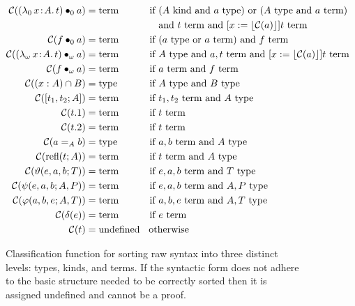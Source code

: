 \begin{figure}
\begin{align*}
        \mathcal{C}(\app{(\abs{\lambda_0}{x}{A}{t})}{0}{a}) &=\!\! \pterm &\text{if }& (A\pkind \text{ and } a\ptype) \text{ or } (A\ptype \text{ and } a\pterm) \\
            &&&\text{and } t\pterm \text{ and } [x := \ptrunc{\mathcal{C}(a)}]t\pterm \\
        \mathcal{C}(\app{f}{0}{a}) &=\!\! \pterm &\text{if }& (a\ptype \text{ or } a\pterm) \text{ and } f\pterm \\
        \mathcal{C}(\app{(\abs{\lambda_\omega}{x}{A}{t})}{\omega}{a}) &=\!\! \pterm &\text{if }& A\ptype \text{ and } a, t\pterm \text{ and } [x := \ptrunc{\mathcal{C}(a)}]t\pterm \\
        \mathcal{C}(\app{f}{\omega}{a}) &=\!\! \pterm &\text{if }& a\pterm \text{ and } f\pterm \\
        \mathcal{C}((x : A) \cap B) &=\!\! \ptype &\text{if }& A\ptype \text{ and } B\ptype \\
        \mathcal{C}([t_1, t_2; A]) &=\!\! \pterm &\text{if }& t_1, t_2\pterm \text{ and } A\ptype \\
        \mathcal{C}(t.1) &=\!\! \pterm &\text{if }& t\pterm \\
        \mathcal{C}(t.2) &=\!\! \pterm &\text{if }& t\pterm \\
        \mathcal{C}(a =_A b) &=\!\! \ptype &\text{if }& a, b\pterm \text{ and } A\ptype \\
        \mathcal{C}(\prefl(t; A)) &=\!\! \pterm &\text{if }& t\pterm \text{ and } A\ptype \\
        \mathcal{C}(\vartheta(e, a, b; T)) &=\!\! \pterm &\text{if }& e, a, b\pterm \text{ and } T\ptype \\
        \mathcal{C}(\psi(e, a, b; A, P)) &=\!\! \pterm &\text{if }& e, a, b\pterm \text{ and } A, P\ptype \\
        \mathcal{C}(\varphi(a, b, e; A, T)) &=\!\! \pterm &\text{if }& a, b, e\pterm \text{ and } A, T\ptype \\
        \mathcal{C}(\delta(e)) &=\!\! \pterm &\text{if }& e\pterm \\
        \mathcal{C}(t) &= \text{undefined} &&\!\!\!\!\!\!\text{otherwise}
    \end{align*}
    \caption{
        Classification function for sorting raw syntax into three distinct levels: types, kinds, and terms.
        If the syntactic form does not adhere to the basic structure needed to be correctly sorted then it is assigned undefined and cannot be a proof.
    }
    \label{fig:2:classify}
\end{figure}
